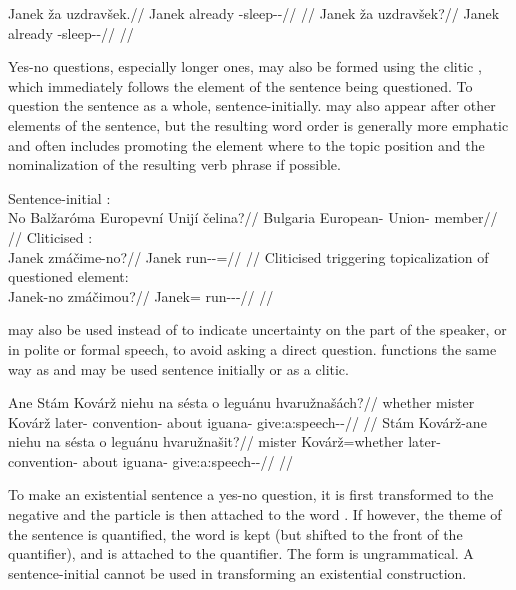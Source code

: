 \pex
\a
\begingl
\gla Janek ža uzdravšek.//
\glb Janek already \Refl{}-sleep-\Av{}-\Pf{}//
\glft {}//
\endgl
\a
\begingl
\gla Janek ža uzdravšek?//
\glb Janek already \Refl{}-sleep-\Av{}-\Pf{}//
\glft {}//
\endgl
\xe

Yes-no questions, especially longer ones, may also be formed using the clitic
, which immediately follows the element of the sentence being
questioned. To question the sentence as a whole,  sentence-initially.
 may also appear after other elements of the sentence, but the resulting
word order is generally more emphatic and often includes promoting the element
where  to the topic position and the nominalization of the resulting
verb phrase if possible.


\pex
\a Sentence-initial :\\
  \begingl
  \gla No Balžaróma Europevní Unijí čelina?//
  \glb \Q{} Bulgaria European-\Att{} Union-\Gen{} member//
  \glft {}//
  \endgl
\a Cliticised :\\
  \begingl
  \gla Janek zmáčime-no?//
  \glb Janek run-\Av{}-\Prog{}=\Q{}//
  \glft {}//
  \endgl
\a Cliticised  triggering topicalization of questioned element:\\
  \begingl
  \gla Janek-no zmáčimou?//
  \glb Janek=\Q{} run-\Av{}-\Prog{}-\Nz{}//
  \glft {}//
  \endgl
\xe

 may also be used instead of  to indicate uncertainty
on the part of the speaker, or in polite or formal speech, to avoid asking a
direct question.  functions the same way as  and may be used
sentence initially or as a clitic.

\pex
\a\begingl
  \gla Ane Stám Kovárž niehu na sésta o leguánu hvaružnašách?//
  \glb whether mister Kovárž later-\Ins{} \Loc{} convention-\Acc{} about iguana-\Ins{} give:a:speech-\Av{}-\Ctp{}//
  \glft {}//
  \endgl
\a\begingl
  \gla Stám Kovárž-ane niehu na sésta o leguánu hvaružnašit?//
  \glb mister Kovárž=whether later-\Ins{} \Loc{} convention-\Acc{} about iguana-\Ins{} give:a:speech-\Av{}-\Sup{}//
  \glft {}//
  \endgl
\xe

To make an existential sentence a yes-no
question, it is first transformed to the negative and the particle 
is then attached to the word . If however, the theme of the sentence
is quantified, the word  is kept (but shifted to
the front of the quantifier), and  is attached to the quantifier. The
form  is ungrammatical. A sentence-initial  cannot be
used in transforming an existential construction.

